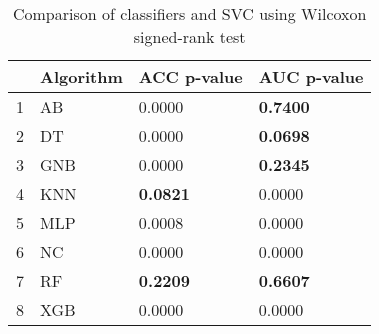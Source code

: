 \begin{table}
\footnotesize
\caption{Comparison of classifiers and SVC using Wilcoxon signed-rank test}
\label{tab:wilcoxon comparison}
\begin{tabular}{llll}
\hline
 & Algorithm & ACC p-value & AUC p-value \\
\hline
1 & AB & 0.0000 & \textbf{0.7400} \\
2 & DT & 0.0000 & \textbf{0.0698} \\
3 & GNB & 0.0000 & \textbf{0.2345} \\
4 & KNN & \textbf{0.0821} & 0.0000 \\
5 & MLP & 0.0008 & 0.0000 \\
6 & NC & 0.0000 & 0.0000 \\
7 & RF & \textbf{0.2209} & \textbf{0.6607} \\
8 & XGB & 0.0000 & 0.0000 \\
\hline
\end{tabular}
\end{table}
